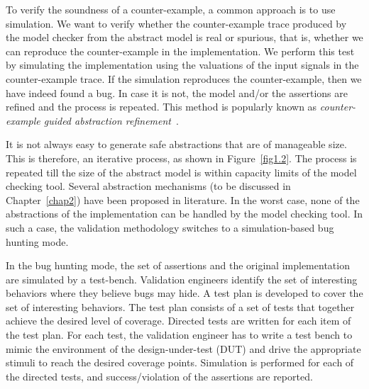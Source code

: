 \noindent
To verify the soundness of a counter-example, a common approach is to use
simulation. We want to verify whether the counter-example
trace produced by the model checker from the abstract model is real or 
spurious, that is,
whether we can reproduce the counter-example in the implementation. We perform
this test by simulating the implementation using the valuations of the input
signals in the counter-example trace. If the simulation reproduces the
counter-example, then we have indeed found a bug. 
In case it is not, the model and/or the assertions 
are refined and the process is repeated.
This method is popularly known as {\em counter-example guided abstraction 
refinement}~\cite{clarke:00b}.

\noindent
It is not always easy to generate safe abstractions that are of manageable 
size. This is therefore, an iterative process, as shown in 
Figure~\ref{fig1.2}. The process is repeated till the size of the abstract 
model is within capacity limits of the model checking tool. Several 
abstraction mechanisms (to be discussed in Chapter~\ref{chap2}) have 
been proposed in literature. In the worst case, none of the abstractions 
of the implementation can be handled by the model checking tool. In such 
a case, the validation methodology switches to a simulation-based bug 
hunting mode. 

\noindent
In the bug hunting mode, the set of assertions and the original 
implementation are simulated by a test-bench. 
Validation engineers identify the set of interesting 
behaviors where they believe bugs may hide. A test plan is developed to 
cover the set of interesting behaviors. The test plan consists of a set 
of tests that together achieve the desired level of coverage. 
Directed tests are written for each item of the test plan. For each test,
the validation engineer has to write a test bench to mimic the
environment of the design-under-test (DUT) and drive the appropriate
stimuli to reach the desired coverage points. Simulation is performed for 
each of the directed tests, and success/violation of the assertions are 
reported.

